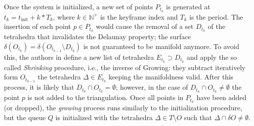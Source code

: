 Once the system is initialized, a new set of points $P_{t_k}$ is generated at $t_k= t_{\text{init}} + k*T_k$, where $k \in \mathbb{N^+}$ is the keyframe index and $T_k$ is the period. 
The insertion of each point $p\in P_{t_k}$ would cause the removal of a set $D_{t_k}$ of the tetrahedra that invalidates the Delaunay property; the surface $\delta (O_{t_k}) = \delta (O_{t_{k-1}} \setminus D_{t_k})$ is not guaranteed to be manifold anymore. 
To avoid this, the authors in \cite{litvinov_lhuillier_13} define a new list of tetrahedra $E_{t_k} \supset D_{t_k}$ and apply the so called \emph{Shrinking} procedure, i.e., the inverse of Growing: they subtract iteratively form $O_{t_{k-1}}$ the tetrahedra  $\Delta \in E_{t_k}$ keeping the manifoldness valid.
After this process, it is likely that $D_{t_k} \cap O_{t_k} = \emptyset$; however, in the case of $D_{t_k} \cap O_{t_k} \neq \emptyset$ the point $p$ is not added to the triangulation.
Once all points in $P_{t_k}$ have been added (or dropped), the \emph{growing} process runs similarly to the initialization procedure, but the queue $Q$ is initialized with the tetrahedra $\Delta \in T \setminus O$ such that  $\Delta \cap \delta O \neq \emptyset$.









